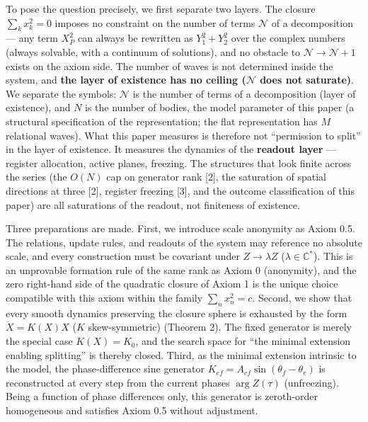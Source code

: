 \documentclass[
  a4paper,
]{article}
\begin{document}
To pose the question precisely, we first separate two layers. The
closure \(\sum_k x_k^2=0\) imposes no constraint on the number of terms
\(\mathcal N\) of a decomposition --- any term \(X_P^2\) can always be
rewritten as \(Y_1^2+Y_2^2\) over the complex numbers (always solvable,
with a continuum of solutions), and no obstacle to
\(\mathcal N\to\mathcal N+1\) exists on the axiom side. The number of
waves is not determined inside the system, and \textbf{the layer of
existence has no ceiling (\(\mathcal N\) does not saturate)}. We
separate the symbols: \(\mathcal N\) is the number of terms of a
decomposition (layer of existence), and \(N\) is the number of bodies,
the model parameter of this paper (a structural specification of the
representation; the flat representation has \(M\) relational waves).
What this paper measures is therefore not ``permission to split'' in the
layer of existence. It measures the dynamics of the \textbf{readout
layer} --- register allocation, active planes, freezing. The structures
that look finite across the series (the \(O(N)\) cap on generator rank
{[}2{]}, the saturation of spatial directions at three {[}2{]}, register
freezing {[}3{]}, and the outcome classification of this paper) are all
saturations of the readout, not finiteness of existence.

Three preparations are made. First, we introduce scale anonymity as
Axiom 0.5. The relations, update rules, and readouts of the system may
reference no absolute scale, and every construction must be covariant
under \(Z\to\lambda Z\) (\(\lambda\in\mathbb C^\ast\)). This is an
unprovable formation rule of the same rank as Axiom 0 (anonymity), and
the zero right-hand side of the quadratic closure of Axiom 1 is the
unique choice compatible with this axiom within the family
\(\sum_n x_n^2=c\). Second, we show that every smooth dynamics
preserving the closure sphere is exhausted by the form \(\dot X=K(X)X\)
(\(K\) skew-symmetric) (Theorem 2). The fixed generator is merely the
special case \(K(X)=K_0\), and the search space for ``the minimal
extension enabling splitting'' is thereby closed. Third, as the minimal
extension intrinsic to the model, the phase-difference sine generator
\(K_{ef}=A_{ef}\sin(\theta_f-\theta_e)\) is reconstructed at every step
from the current phases \(\arg Z(\tau)\) (unfreezing). Being a function
of phase differences only, this generator is zeroth-order homogeneous
and satisfies Axiom 0.5 without adjustment.
\end{document}
